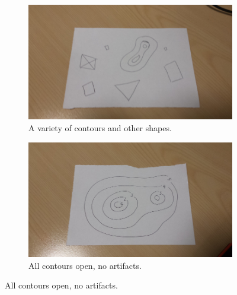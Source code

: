 \documentclass[11pt]{article}
\begin{document}
\begin{figure}[H]
	\centering
	\begin{subfigure}[t]{.4\textwidth}
		\centering
		\includegraphics[scale=0.3]{pics/normal.jpg}
		\caption{A variety of contours and other shapes.}
		\label{fig:landscapeMapNormal}
	\end{subfigure}
	\hfill
	\begin{subfigure}[t]{.4\textwidth}
		\centering
		\includegraphics[scale=0.3]{pics/height.jpg}
		\caption{All contours open, no artifacts.}
		\label{fig:landscapeMapHeight}
	\end{subfigure}
	

\end{figure}
\end{document}
